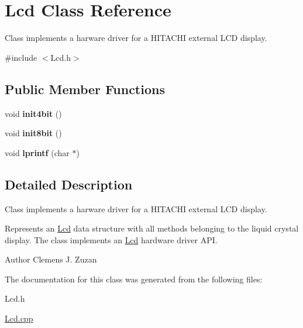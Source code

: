\hypertarget{class_lcd}{}\section{Lcd Class Reference}
\label{class_lcd}


Class implements a harware driver for a H\+I\+T\+A\+C\+HI external L\+CD display.  




{\ttfamily \#include $<$Lcd.\+h$>$}

\subsection*{Public Member Functions}
\begin{DoxyCompactItemize}
\item 
\mbox{\label{class_lcd_aaff48430a9f0c34151db269b8ce5824d}} 
void {\bfseries init4bit} ()
\item 
\mbox{\label{class_lcd_a3267ba01aadbc8268f9a834b1912475f}} 
void {\bfseries init8bit} ()
\item 
\mbox{\label{class_lcd_ab23b853ae96b814df53d60060845c3f3}} 
void {\bfseries lprintf} (char $\ast$)
\end{DoxyCompactItemize}


\subsection{Detailed Description}
Class implements a harware driver for a H\+I\+T\+A\+C\+HI external L\+CD display. 

Represents an \mbox{\hyperlink{class_lcd}{Lcd}} data structure with all methods belonging to the liquid crystal display. The class implements an \mbox{\hyperlink{class_lcd}{Lcd}} hardware driver A\+PI.

\begin{DoxyAuthor}{Author}
Clemens J. Zuzan 
\end{DoxyAuthor}


The documentation for this class was generated from the following files\+:\begin{DoxyCompactItemize}
\item 
Lcd.\+h\item 
\mbox{\hyperlink{_lcd_8cpp}{Lcd.\+cpp}}\end{DoxyCompactItemize}
